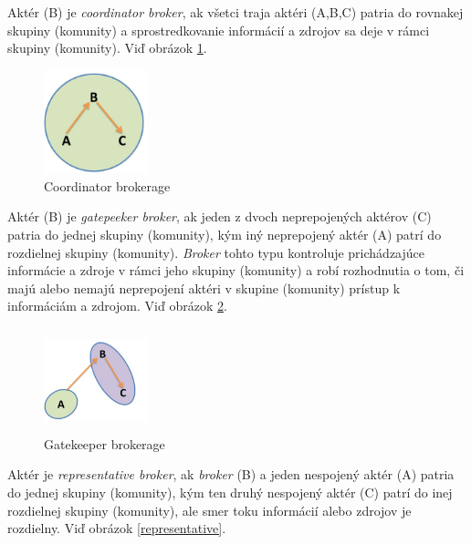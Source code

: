 \documentclass[slovak,master,public,dept460,male,cpdeclaration,oneside]{diploma}
\begin{document}
\begin{definition}
Aktér (B) je \textit{coordinator broker}, ak všetci traja aktéri (A,B,C) patria do rovnakej skupiny (komunity) a sprostredkovanie informácií a zdrojov sa deje v rámci skupiny (komunity).  Viď obrázok \ref{coordinator}.
\end{definition}

\begin{figure}[H]
\centering
\includegraphics[width=3cm, height=3cm]{figures/coordinator}
\caption{Coordinator brokerage}
\label{coordinator}
\end{figure}


\begin{definition}
Aktér (B) je \textit{gatepeeker broker}, ak jeden z dvoch neprepojených aktérov (C) patria do jednej skupiny (komunity), kým iný neprepojený aktér (A) patrí do rozdielnej skupiny (komunity). \textit{Broker} tohto typu kontroluje prichádzajúce informácie a zdroje v rámci jeho skupiny (komunity) a robí rozhodnutia o tom, či majú alebo nemajú neprepojení aktéri v skupine (komunity) prístup k informáciám a zdrojom.  Viď obrázok \ref{gatepeeker}.
\end{definition}

\begin{figure}[H]
\centering
\includegraphics[width=3cm, height=3cm]{figures/gatepeeker}
\caption{Gatekeeper brokerage}
\label{gatepeeker}
\end{figure}

\begin{definition}
Aktér je \textit{representative broker}, ak \textit{broker} (B) a jeden nespojený aktér (A) patria do jednej skupiny (komunity), kým ten druhý nespojený aktér (C) patrí do inej rozdielnej skupiny (komunity), ale  smer toku informácií alebo zdrojov je rozdielny. Viď obrázok \ref{representative}.
\end{definition}
\end{document}
